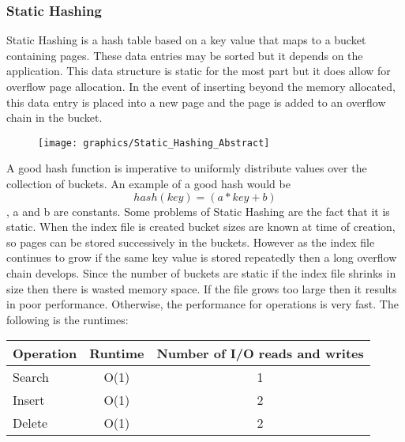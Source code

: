 \documentclass[letterpaper, 12pt]{article}
\begin{document}
\subsubsection{Static Hashing}
Static Hashing is a hash table based on a key value that maps to a bucket containing pages. These 
data entries may be sorted but it depends on the application. This data structure is static 
for the most part but it does allow for overflow page allocation. In the event of inserting 
beyond the memory allocated, this data entry is placed into a new page and the page is added 
to an overflow chain in the bucket.
\par\vspace{\baselineskip}
\begin{figure}
  \centering
  \texttt{[image: graphics/Static\_Hashing\_Abstract]}
\end{figure}

A good hash function is imperative to uniformly distribute values over the collection of buckets. 
An example of a good hash would be \[hash(key) = (a*key + b)\], a and b are constants. Some problems 
of Static Hashing are the fact that it is static. When the index file is created bucket sizes 
are known at time of creation, so pages can be stored successively in the buckets. However 
as the index file continues to grow if the same key value is stored repeatedly then a long 
overflow chain develops. Since the number of buckets are static if the index file shrinks 
in size then there is wasted memory space. If the file grows too large then it results in 
poor performance. Otherwise, the performance for operations is very fast. The following 
is the runtimes:

\par\vspace{\baselineskip}

\begin{center}
\begin{tabular}{l | c | c}
  \hline
  Operation & Runtime & Number of I/O reads and writes \\ \hline \hline
  Search & O(1) & 1  \\ \hline
  Insert & O(1) & 2  \\ \hline
  Delete & O(1) & 2  \\ \hline
\end{tabular}
\end{center}

\par\vspace{\baselineskip}
\end{document}
